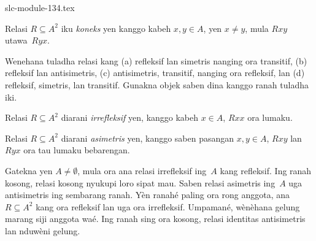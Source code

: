 \begin{filecontents*}[overwrite]{slc-module-134.tex}
\begin{defn}[Koneksitas]
Relasi $R \subseteq A^2$ iku \emph{koneks} yen kanggo kabeh
$x,y\in A$, yen $x \neq y$, mula $Rxy$ utawa~$Ryx$.
\end{defn}

\begin{prob}
Wenehana tuladha relasi kang (a) refleksif lan simetris
nanging ora transitif, (b) refleksif lan antisimetris,
(c) antisimetris, transitif, nanging ora refleksif, lan
(d) refleksif, simetris, lan transitif.
Gunakna objek saben dina kanggo ranah tuladha iki.
\end{prob}

\begin{defn}[Irrefleksivitas]
Relasi $R \subseteq A^2$ diarani \emph{irrefleksif}
yen, kanggo kabeh $x \in A$, $Rxx$ ora lumaku.
\end{defn}

\begin{defn}[Asimetri]
Relasi $R \subseteq A^2$ diarani \emph{asimetris}
yen, kanggo saben pasangan $x,y\in A$, $Rxy$ lan~$Ryx$
ora tau lumaku bebarengan.
\end{defn}

Gatekna yen $A \neq \emptyset$, mula ora ana relasi
irrefleksif ing~$A$ kang refleksif. Ing ranah kosong,
relasi kosong nyukupi loro sipat mau. Saben relasi
asimetris ing~$A$ uga antisimetris ing sembarang ranah.
Yèn ranahé paling ora rong anggota, ana $R \subseteq A^2$ kang
ora refleksif lan uga ora irrefleksif. Umpamané, wènèhana gelung marang
siji anggota waé. Ing ranah sing ora kosong, relasi
identitas antisimetris lan nduwèni gelung.


\end{filecontents*}

